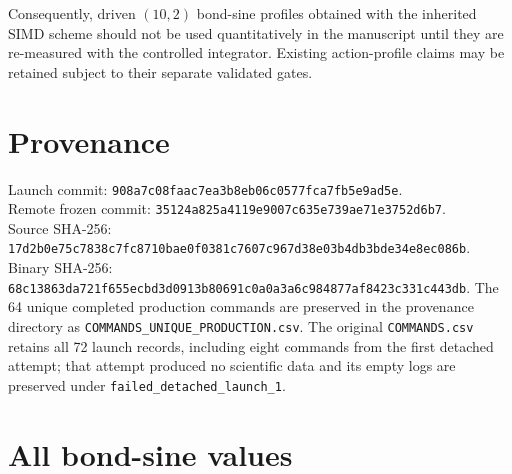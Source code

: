 \documentclass[10pt]{article}
\begin{document}
Consequently, driven $(10,2)$ bond-sine profiles obtained with the inherited
SIMD scheme should not be used quantitatively in the manuscript until they are
re-measured with the controlled integrator. Existing action-profile claims may
be retained subject to their separate validated gates.

\section{Provenance}
Launch commit: \nolinkurl{908a7c08faac7ea3b8eb06c0577fca7fb5e9ad5e}.\\
Remote frozen commit: \nolinkurl{35124a825a4119e9007c635e739ae71e3752d6b7}.\\
Source SHA-256: \nolinkurl{17d2b0e75c7838c7fc8710bae0f0381c7607c967d38e03b4db3bde34e8ec086b}.\\
Binary SHA-256: \nolinkurl{68c13863da721f655ecbd3d0913b80691c0a0a3a6c984877af8423c331c443db}.
The 64 unique completed production commands are preserved in the provenance
directory as \texttt{COMMANDS\_UNIQUE\_}\allowbreak\texttt{PRODUCTION.csv}.
The original \texttt{COMMANDS.csv} retains all 72 launch records, including eight
commands from the first detached attempt; that attempt produced no scientific
data and its empty logs are preserved under
\texttt{failed\_detached\_launch\_1}.

\clearpage
\appendix
\section{All bond-sine values}
\end{document}
